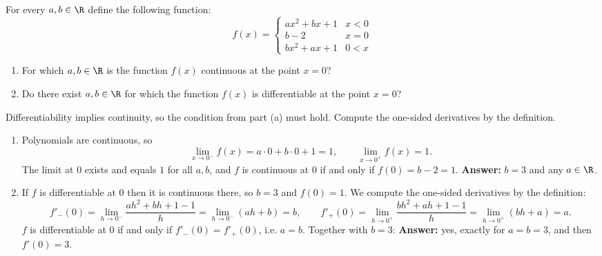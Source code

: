 
\begin{question}
For every $a,b\in\R$ define the following function:
\[ f(x)=\begin{cases} ax^2+bx+1 & x<0\\ b-2 & x=0\\ bx^2+ax+1 & 0<x\end{cases} \]
\begin{enumerate}
  \item For which $a,b\in\R$ is the function $f(x)$ continuous at the point $x=0$?
  \item Do there exist $a,b\in\R$ for which the function $f(x)$ is differentiable at the point $x=0$?
\end{enumerate}
\end{question}

\begin{hint}
Differentiability implies continuity, so the condition from part (a) must hold. Compute the one-sided derivatives by the definition.
\end{hint}

\begin{solution}
\begin{enumerate}
  \item Polynomials are continuous, so
  \[ \lim_{x\to0^-}f(x)=a\cdot0+b\cdot0+1=1,\qquad \lim_{x\to0^+}f(x)=1. \]
  The limit at $0$ exists and equals $1$ for all $a,b$, and $f$ is continuous at $0$ if and only if $f(0)=b-2=1$.
  \textbf{Answer:} $b=3$ and any $a\in\R$.
  \item If $f$ is differentiable at $0$ then it is continuous there, so $b=3$ and $f(0)=1$. We compute the one-sided derivatives by the definition:
  \[ f'_-(0)=\lim_{h\to0^-}\frac{ah^2+bh+1-1}{h}=\lim_{h\to0^-}(ah+b)=b, \qquad f'_+(0)=\lim_{h\to0^+}\frac{bh^2+ah+1-1}{h}=\lim_{h\to0^+}(bh+a)=a. \]
  $f$ is differentiable at $0$ if and only if $f'_-(0)=f'_+(0)$, i.e. $a=b$. Together with $b=3$:
  \textbf{Answer:} yes, exactly for $a=b=3$, and then $f'(0)=3$.
\end{enumerate}
\end{solution}
